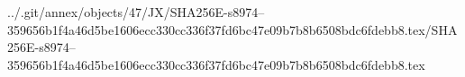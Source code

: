 ../.git/annex/objects/47/JX/SHA256E-s8974--359656b1f4a46d5be1606ecc330cc336f37fd6bc47e09b7b8b6508bdc6fdebb8.tex/SHA256E-s8974--359656b1f4a46d5be1606ecc330cc336f37fd6bc47e09b7b8b6508bdc6fdebb8.tex